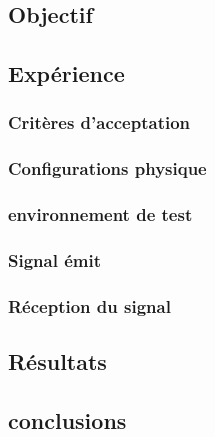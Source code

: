 \documentclass[12pt,a4paper]{report}
\author{Baptiste Lesquoy}
\begin{document}
\chapter{}
\section{Objectif}

\section{Expérience}
\subsection{Critères d'acceptation}

\subsection{Configurations physique}

\subsection{environnement de test}

\subsection{Signal émit}
\subsection{Réception du signal}
\section{Résultats}
\section{conclusions}
\end{document}
